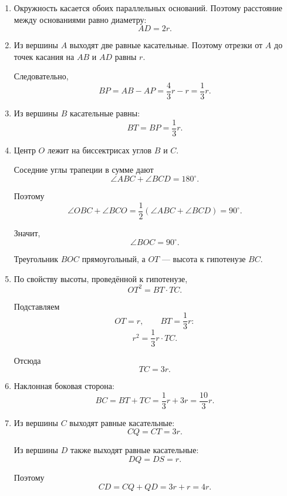 \documentclass[a4paper,12pt]{article}
\begin{document}
\begin{enumerate}

    \item Окружность касается обоих параллельных оснований.
    Поэтому расстояние между основаниями
    равно диаметру:
    \[
        AD=2r.
    \]

    \item Из вершины $A$ выходят две равные касательные.
    Поэтому отрезки от $A$
    до точек касания на $AB$ и $AD$
    равны $r$.

    Следовательно,
    \[
        BP
        =
        AB-AP
        =
        \frac43r-r
        =
        \frac13r.
    \]

    \item Из вершины $B$ касательные равны:
    \[
        BT=BP=\frac13r.
    \]

    \item Центр $O$ лежит на биссектрисах
    углов $B$ и $C$.

    Соседние углы трапеции в сумме дают
    \[
        \angle ABC+\angle BCD=180^\circ.
    \]

    Поэтому
    \[
        \angle OBC+\angle BCO
        =
        \frac12\left(
            \angle ABC+\angle BCD
        \right)
        =
        90^\circ.
    \]

    Значит,
    \[
        \angle BOC=90^\circ.
    \]

    Треугольник $BOC$ прямоугольный,
    а $OT$ --- высота к гипотенузе $BC$.

    \item По свойству высоты,
    проведённой к гипотенузе,
    \[
        OT^2=BT\cdot TC.
    \]

    Подставляем
    \[
        OT=r,
        \qquad
        BT=\frac13r:
    \]
    \[
        r^2
        =
        \frac13r\cdot TC.
    \]

    Отсюда
    \[
        TC=3r.
    \]

    \item Наклонная боковая сторона:
    \[
        BC
        =
        BT+TC
        =
        \frac13r+3r
        =
        \frac{10}{3}r.
    \]

    \item Из вершины $C$ выходят равные касательные:
    \[
        CQ=CT=3r.
    \]

    Из вершины $D$ также выходят равные касательные:
    \[
        DQ=DS=r.
    \]

    Поэтому
    \[
        CD
        =
        CQ+QD
        =
        3r+r
        =
        4r.
    \]

\end{enumerate}
\end{document}
